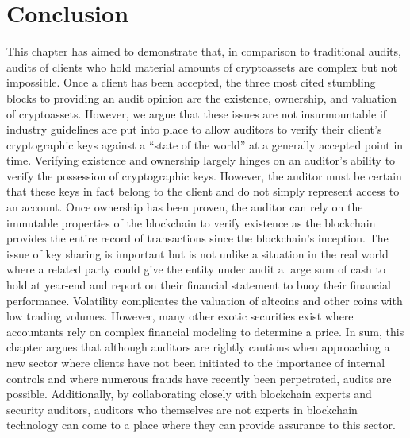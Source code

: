 

\section{Conclusion} \label{sec:auditing:conclusion}


This chapter has aimed to demonstrate that, in comparison to traditional audits, audits of clients who hold material amounts of cryptoassets are complex but not impossible. Once a client has been accepted, the three most cited stumbling blocks to providing an audit opinion are the existence, ownership, and valuation of cryptoassets. However, we argue that these issues are not insurmountable if industry guidelines are put into place to allow auditors to verify their client's cryptographic keys against a ``state of the world'' at a generally accepted point in time. Verifying existence and ownership largely hinges on an auditor's ability to verify the possession of cryptographic keys. However, the auditor must be certain that these keys in fact belong to the client and do not simply represent access to an account. Once ownership has been proven, the auditor can rely on the immutable properties of the blockchain to verify existence as the blockchain provides the entire record of transactions since the blockchain's inception. The issue of key sharing is important but is not unlike a situation in the real world where a related party could give the entity under audit a large sum of cash to hold at year-end and report on their financial statement to buoy their financial performance. Volatility complicates the valuation of altcoins and other coins with low trading volumes. However, many other exotic securities exist where accountants rely on complex financial modeling to determine a price.
In sum, this chapter argues that although auditors are rightly cautious when approaching a new sector where clients have not been initiated to the importance of internal controls and where numerous frauds have recently been perpetrated, audits are possible. Additionally, by collaborating closely with blockchain experts and security auditors, auditors who themselves are not experts in blockchain technology can come to a place where they can provide assurance to this sector.




